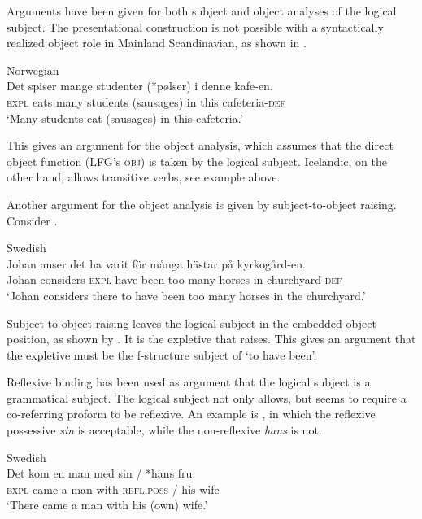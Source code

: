 \documentclass[output=paper,hidelinks]{langscibook}
\begin{document}
 Arguments have been given for both subject and object analyses of the logical subject. The presentational construction is not possible with a syntactically realized object role in Mainland Scandinavian, as shown in .



\ea\label{ex:Scandinavian:52} Norwegian\\
\gll
 {Det} {spiser} {mange} {studenter} {(*pølser)} {i} {denne} {kafe-en.}\\
 \textsc{expl} eats many students (sausages) in this cafeteria-\textsc{def}\\
\glt `Many students eat (sausages) in this cafeteria.'\z

\noindent This gives an argument for the object analysis, which assumes that the direct object function (LFG's \textsc{obj}) is taken by the logical subject. Icelandic, on the other hand, allows transitive verbs, see example  above.

 Another argument for the object analysis is given by subject-to-object raising. Consider .



\ea\label{ex:Scandinavian:53} Swedish \citep[268]{ZEM17}\\
\gll
 {Johan} {anser} {det} {ha} {varit} {för} {många} {hästar} {på} {kyrkogård-en}\textsc{.}\\
 Johan considers \textsc{expl} have been too many horses in churchyard-\textsc{def}\\
\glt `Johan considers there to have been too many horses in the churchyard.'\z

\noindent Subject-to-object raising leaves the logical subject in the embedded object position, as shown by . It is the expletive that raises. This gives an argument that the expletive must be the f-structure subject of `to have been'.

 Reflexive binding has been used as argument that the logical subject is a grammatical subject. The logical subject not only allows, but seems to require a co-referring proform to be reflexive. An example is , in which the reflexive possessive \textit{sin} is acceptable, while the non-reflexive \textit{hans} is not.



\ea\label{ex:Scandinavian:54} Swedish \citep{BV05}\\
\gll
 {Det} {kom} {en} {man} {med} {sin} {/} {*hans} {fru}\textsc{.}\\
 \textsc{expl} came a man with \textsc{refl.poss} \textsc{/} his wife\\
\glt `There came a man with his (own) wife.'\z
\end{document}
